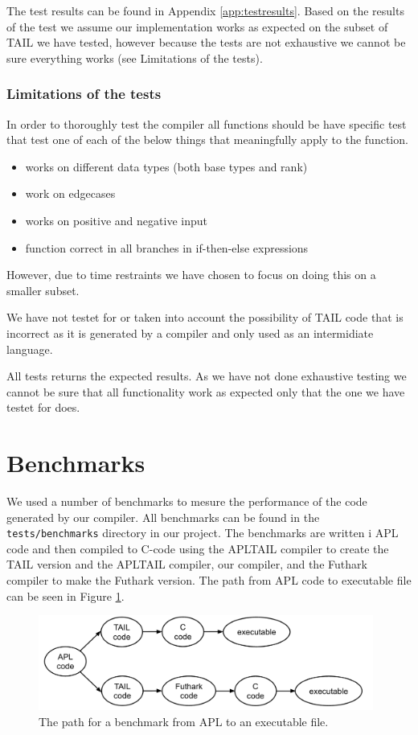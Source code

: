 \documentclass[11pt]{article}
\begin{document}
The test results can be found in Appendix \ref{app:testresults}. Based on the results of the test we assume our implementation works as expected on the subset of TAIL we have tested, however because the tests are not exhaustive we cannot be sure everything works (see Limitations of the tests).

\subsubsection{Limitations of the tests}
In order to thoroughly test the compiler all functions should be have specific test that test one of each of the below things
that meaningfully apply to the function. 
\begin{itemize}
\item works on different data types (both base types and rank)
\item work on edgecases
\item works on positive and negative input
\item function correct in all branches in if-then-else expressions
\end{itemize}
However, due to time restraints we have chosen to focus on doing this on a smaller subset. 

We have not testet for or taken into account the possibility of TAIL code that is incorrect as it is generated by a compiler and only used as an intermidiate language. 

All tests returns the expected results. 
As we have not done exhaustive testing we cannot be sure that all functionality work as expected only that the one we have testet for does. 

\section{Benchmarks}
\label{sec:benchmarks}
We used a number of benchmarks to mesure the performance of the code generated by our compiler. 
All benchmarks can be found in the {\tt tests/benchmarks} directory in our project. 
The benchmarks are written i APL code and then compiled to C-code using the APLTAIL compiler to create the TAIL version and the APLTAIL compiler, our compiler, and the Futhark compiler to make the Futhark version. The path from APL code to executable file can be seen in Figure \ref{fig:code}.

\begin{figure}[h]
\begin{center}
    \includegraphics[width=11cm]{code.png}
    \caption{The path for a benchmark from APL to an executable file.}
    \label{fig:code}
\end{center}
\end{figure}
\end{document}

